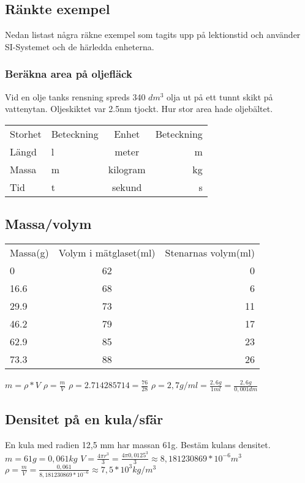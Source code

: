 \documentclass[a4paper,11pt]{article}
\begin{document}
\begin{flushleft}
\section{Ränkte exempel}
Nedan listast några räkne exempel som tagits upp på lektionstid och använder SI-Systemet och de härledda enheterna.

\subsubsection{Beräkna area på oljefläck} Vid en olje tanks rensning spreds 340 $ dm^3 $ olja ut på ett tunnt skikt på vattenytan.
Oljeskiktet var 2.5nm tjockt.\newline
Hur stor area hade oljebältet.
\newline

\begin{tabular}{l l | c r}
  Storhet & Beteckning & Enhet & Beteckning\\
  Längd & l & meter & m\\
  Massa & m & kilogram & kg\\
  Tid & t & sekund & s\\
\end{tabular}


\subsection{Massa/volym}


\begin{tabular}{l c r}
  Massa(g) & Volym i mätglaset(ml) & Stenarnas volym(ml)\\
  0 & 62 & 0\\
  16.6 & 68 & 6\\
  29.9 & 73 & 11\\
  46.2 & 79 & 17\\
  62.9 & 85 & 23\\
  73.3 & 88 & 26\\
\end{tabular}
\newline
\newline
$ m = \rho * V  $
\newline
$ \rho = \frac{m}{V} $
\newline
$ \rho = 2.714285714 = \frac{76}{28} $\newline
$ \rho = 2,7 g/ml = \frac{2,6 g}{1 ml} = \frac{2,6 g}{0,001 dm} $
\newpage

\subsection{Densitet på en kula/sfär}
En kula med radien 12,5 mm har massan 61g.\newline
Bestäm kulans densitet.\newline
$ m = 61g = 0,061 kg $\newline
$ V = \frac{4\pi r^3}{3} = \frac{4\pi 0,0125^3}{3} \approx 8,181230869*10^{-6} m^3 $\newline
$ \rho = \frac{m}{V} = \frac{0,061}{8,181230869*10^{-6}} \approx 7,5*10^3 kg/m^3 $\newline
\newline

\end{flushleft}
\end{document}
